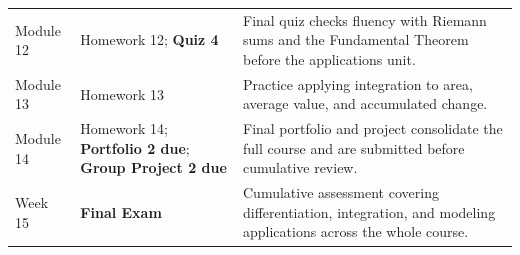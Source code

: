 \documentclass{article}
\begin{document}
\begin{longtable}{p{2.2cm} p{6.3cm} p{6cm}}
Module 12 & Homework 12; \textbf{Quiz 4} & Final quiz checks fluency with Riemann sums and the Fundamental Theorem before the applications unit. \\
Module 13 & Homework 13 & Practice applying integration to area, average value, and accumulated change. \\
Module 14 & Homework 14; \textbf{Portfolio 2 due}; \textbf{Group Project 2 due} & Final portfolio and project consolidate the full course and are submitted before cumulative review. \\
Week 15 & \textbf{Final Exam} & Cumulative assessment covering differentiation, integration, and modeling applications across the whole course. \\
\end{longtable}
\end{document}
